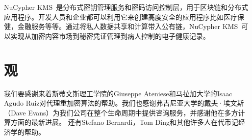 \documentclass[longbibliography,nofootinbib]{revtex4-1}
\newcommand{\kms}{NuCypher KMS}
\begin{document}
\begin{CJK*}{UTF8}{gbsn}
    \kms~是分布式密钥管理服务和密码访问控制层，用于区块链和分布式应用程序。开发人员和企业都可以利用它来创建高度安全的应用程序比如医疗保健，金融服务等等。通过将私人数据共享和计算带入公有链，\kms~可以实现从加密内容市场到秘密凭证管理到病人控制的电子健康记录。


\section{观}

	我们要感谢来着斯蒂文斯理工学院的Giuseppe Ateniese和马拉加大学的Isaac Agudo Ruiz对代理重加密算法的帮助。我们也感谢弗吉尼亚大学的戴夫·埃文斯（Dave Evans）为我们公司在整个生命周期中提供咨询服务，并感谢他在多方计算方面的最新进展。 还有Stefano Bernardi，Tom Ding和其他许多人在代币记经济学的帮助。
    
\end{CJK*}


\end{document}

